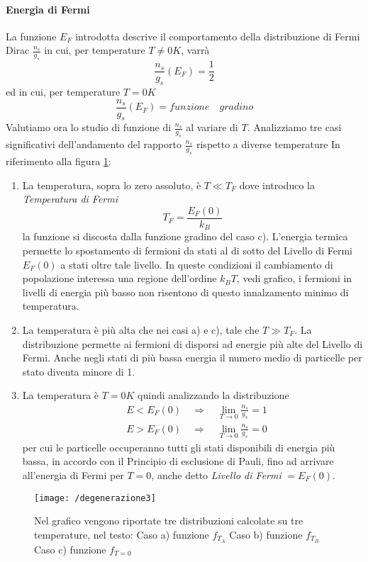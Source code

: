 \paragraph{Energia di Fermi} La funzione $E_F$ introdotta descrive il comportamento della distribuzione di Fermi Dirac $\frac{n_s}{g_s}$ in cui, per temperature $T\not=0K$, varrà
\begin{equation}
\frac{n_s}{g_s} (E_F) = \frac{1}{2}
\end{equation}
ed in cui, per temperature $T=0K$
\begin{equation}
\frac{n_s}{g_s} (E_F) = funzione \quad gradino
\end{equation}
Valutiamo ora lo studio di funzione di $\frac{ n_s}{g_s }$ al variare di $T$.
Analizziamo tre casi significativi dell'andamento del rapporto $\frac{ n_s}{g_s }$ rispetto a diverse temperature
In riferimento alla figura \ref{grafico_distribuzioni}:
\begin{enumerate}[label=Caso \alph*)]
\item La temperatura, sopra lo zero assoluto, è $T \ll T_F$ dove introduco la \textit{Temperatura di Fermi}
\begin{equation}
T_F = \frac{ E_F(0)}{k_B }
\end{equation}
la funzione si discosta dalla funzione gradino del caso c).
L'energia termica permette lo spostamento di fermioni da stati al di sotto del Livello di Fermi $E_F(0)$ a stati oltre tale livello.
In queste condizioni il cambiamento di popolazione interessa una regione dell'ordine $k_B T$, vedi grafico, i fermioni in livelli di energia più basso non risentono di questo innalzamento minimo di temperatura.
\item La temperatura è più alta che nei casi a) e c), tale che $T \gg T_F$.
La distribuzione permette ai fermioni di disporsi ad energie più alte del Livello di Fermi.
Anche negli stati di più bassa energia il numero medio di particelle per stato diventa minore di 1.
\item La temperatura è $T = 0 K$ quindi analizzando la distribuzione
\begin{equation}
\begin{split}
& E<E_F(0) \quad\Rightarrow\quad \lim_{T \to 0} \frac{n_s}{g_s} = 1 \\
& E>E_F(0) \quad\Rightarrow\quad \lim_{T \to 0} \frac{n_s}{g_s} = 0
\end{split}
\end{equation}
per cui le particelle occuperanno tutti gli stati disponibili di energia più bassa, in accordo con il Principio di esclusione di Pauli, fino ad arrivare all'energia di Fermi per $T=0$, anche detto \textit{Livello di Fermi} $= E_F(0)$.
\end{enumerate}
\begin{figure}[h]
\centering
\texttt{[image: /degenerazione3]}
\label{grafico_distribuzioni}
\caption{Nel grafico vengono riportate tre distribuzioni calcolate su tre temperature, nel testo: \quad
Caso a) funzione $f_{T_A}$
Caso b) funzione $f_{T_B}$
Caso c) funzione $f_{T=0}$
}
\end{figure}

